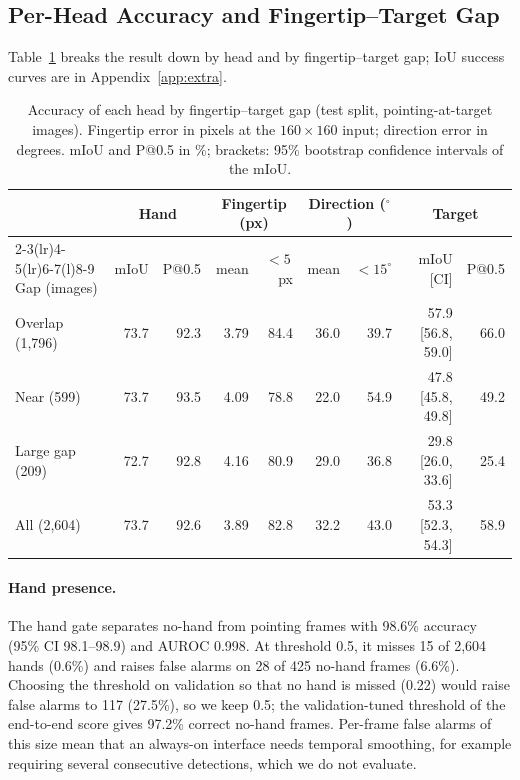 \subsection{Per-Head Accuracy and Fingertip--Target Gap}\label{sec:heads-results}

Table~\ref{tab:heads} breaks the result down by head and by fingertip--target gap; IoU success curves are in Appendix~\ref{app:extra}.

\begin{table}[t]
  \caption{Accuracy of each head by fingertip--target gap (test split, pointing-at-target images). Fingertip error in pixels at the $160\times160$ input; direction error in degrees. mIoU and P@0.5 in \%; brackets: 95\% bootstrap confidence intervals of the mIoU.}
  \label{tab:heads}
  \footnotesize
  \setlength{\tabcolsep}{4pt}
  \begin{tabular}{lrrrrrrrr}
    \toprule
    & \multicolumn{2}{c}{Hand} & \multicolumn{2}{c}{Fingertip (px)} & \multicolumn{2}{c}{Direction ($^\circ$)} & \multicolumn{2}{c}{Target} \\
    \cmidrule(lr){2-3}\cmidrule(lr){4-5}\cmidrule(lr){6-7}\cmidrule(l){8-9}
    Gap (images) & mIoU & P@0.5 & mean & ${<}5$\,px & mean & ${<}15^\circ$ & mIoU [CI] & P@0.5 \\
    \midrule
    Overlap (1,796) & 73.7 & 92.3 & 3.79 & 84.4 & 36.0 & 39.7 & 57.9 [56.8, 59.0] & 66.0 \\
    Near (599) & 73.7 & 93.5 & 4.09 & 78.8 & 22.0 & 54.9 & 47.8 [45.8, 49.8] & 49.2 \\
    Large gap (209) & 72.7 & 92.8 & 4.16 & 80.9 & 29.0 & 36.8 & 29.8 [26.0, 33.6] & 25.4 \\
    \midrule
    All (2,604) & 73.7 & 92.6 & 3.89 & 82.8 & 32.2 & 43.0 & 53.3 [52.3, 54.3] & 58.9 \\
    \bottomrule
  \end{tabular}
\end{table}

\paragraph{Hand presence.} The hand gate separates no-hand from pointing frames with 98.6\% accuracy (95\% CI 98.1--98.9) and AUROC 0.998. At threshold 0.5, it misses 15 of 2,604 hands (0.6\%) and raises false alarms on 28 of 425 no-hand frames (6.6\%). Choosing the threshold on validation so that no hand is missed (0.22) would raise false alarms to 117 (27.5\%), so we keep 0.5; the validation-tuned threshold of the end-to-end score gives 97.2\% correct no-hand frames. Per-frame false alarms of this size mean that an always-on interface needs temporal smoothing, for example requiring several consecutive detections, which we do not evaluate.

